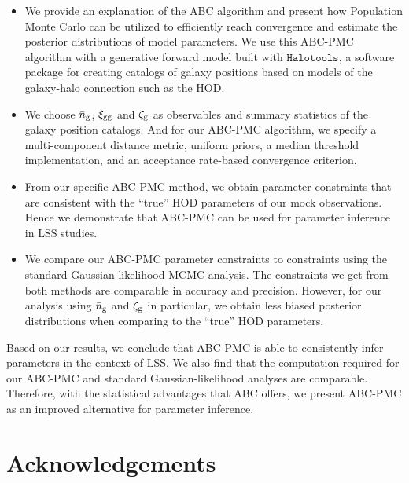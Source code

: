 \begin{itemize}
\item We provide an explanation of the ABC algorithm and present how Population Monte Carlo can be utilized 
to efficiently reach convergence and estimate the posterior distributions of model parameters. 
We use this ABC-PMC algorithm with a generative forward model built with $\mathtt{Halotools}$, a software 
package for creating catalogs of galaxy positions based on models of the galaxy-halo connection such as the HOD. 

\item We choose $\bar{n}_{\mathrm{g}}$, $\xi_{\mathrm{gg}}$ and $\mathcal{\zeta}_{\rm g}$ as observables and summary statistics of the galaxy position catalogs. 
And for our ABC-PMC algorithm, we specify a multi-component distance metric, uniform priors, 
a median threshold implementation, and an acceptance rate-based convergence criterion.

\item From our specific ABC-PMC method, we obtain parameter constraints that are consistent with the ``true'' HOD parameters of our mock observations. Hence we demonstrate that ABC-PMC can be used for parameter inference in LSS studies. 

\item We compare our ABC-PMC parameter constraints to constraints using the standard Gaussian-likelihood
MCMC analysis. The constraints we get from both methods are comparable in accuracy and precision. However, 
for our analysis using $\bar{n}_{\mathrm{g}}$ and $\mathcal{\zeta}_{\rm g}$ in particular, we obtain less biased posterior distributions when
comparing to the ``true'' HOD parameters. 
\end{itemize}

Based on our results, we conclude that ABC-PMC is able to consistently infer parameters in the context
of LSS. We also find that the computation required for our ABC-PMC and standard Gaussian-likelihood 
analyses are comparable. Therefore, with the statistical advantages that ABC offers, we present ABC-PMC 
as an improved alternative for parameter inference. 


\section*{Acknowledgements}

